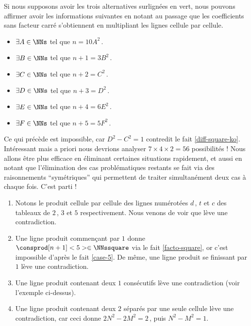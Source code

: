 Si nous supposons avoir les trois alternatives surlignées en vert, nous pouvons affirmer avoir les informations suivantes en notant au passage que les coefficients sans facteur carré s'obtiennent en multipliant les lignes cellule par cellule.%
\vspace{-1ex}
\begin{multicols}{2}
	\begin{itemize}
		\item $\exists A \in \NNs$ tel que $n     = 10 A^2$\,.

		\item $\exists B \in \NNs$ tel que $n + 1 = 3  B^2$\,.

		\item $\exists C \in \NNs$ tel que $n + 2 =    C^2$\,.

		\item $\exists D \in \NNs$ tel que $n + 3 =    D^2$\,.

		\item $\exists E \in \NNs$ tel que $n + 4 = 6  E^2$\,.

		\item $\exists F \in \NNs$ tel que $n + 5 = 5  F^2$\,.
	\end{itemize}
\end{multicols}
\vspace{-1ex}
Ce qui précède est impossible, car $D^2 - C^2 = 1$ contredit le fait \ref{diff-square-ko}.
Intéressant mais a priori nous devrions analyser $7 \times 4 \times 2 = 56$ possibilités ! 
Nous allons être plus efficace en éliminant certaines situations rapidement, et aussi en notant que l'élimination des cas problématiques restants se fait via des raisonnements \enquote{symétriques} qui permettent de traiter simultanément  deux cas à chaque fois. C'est parti !
%
\begin{enumerate}
	\item Notons  le produit cellule par cellule des lignes numérotées $d$\,, $t$ et $c$ des tableaux de $2$\,, $3$ et $5$ respectivement.
	Nous venons de voir que  lève une contradiction.


	\item \label{KO-1*-or-*1}
	Une ligne produit  commençant par $1$ donne
	$\consprod[n+1]<5> \in \NNssquare$ via le fait \ref{facto-square}, or c'est impossible d'après le fait \ref{case-5}.
	De même, une ligne produit se finissant par $1$ lève une contradiction.


	\item \label{KO-11}
	Une ligne produit  contenant deux $1$ consécutifs lève une contradiction (voir l'exemple ci-dessus).


	\item \label{KO-2*2}
	Une ligne produit  contenant deux $2$ séparés par une seule cellule lève une contradiction, car ceci donne $2 N^2 - 2 M^2 = 2$\,, puis $N^2 - M^2 = 1$.
\end{enumerate}


